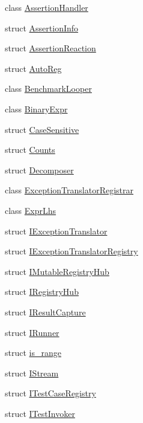 \begin{DoxyCompactItemize}
\item 
class \mbox{\hyperlink{class_catch_1_1_assertion_handler}{Assertion\+Handler}}
\item 
struct \mbox{\hyperlink{struct_catch_1_1_assertion_info}{Assertion\+Info}}
\item 
struct \mbox{\hyperlink{struct_catch_1_1_assertion_reaction}{Assertion\+Reaction}}
\item 
struct \mbox{\hyperlink{struct_catch_1_1_auto_reg}{Auto\+Reg}}
\item 
class \mbox{\hyperlink{class_catch_1_1_benchmark_looper}{Benchmark\+Looper}}
\item 
class \mbox{\hyperlink{class_catch_1_1_binary_expr}{Binary\+Expr}}
\item 
struct \mbox{\hyperlink{struct_catch_1_1_case_sensitive}{Case\+Sensitive}}
\item 
struct \mbox{\hyperlink{struct_catch_1_1_counts}{Counts}}
\item 
struct \mbox{\hyperlink{struct_catch_1_1_decomposer}{Decomposer}}
\item 
class \mbox{\hyperlink{class_catch_1_1_exception_translator_registrar}{Exception\+Translator\+Registrar}}
\item 
class \mbox{\hyperlink{class_catch_1_1_expr_lhs}{Expr\+Lhs}}
\item 
struct \mbox{\hyperlink{struct_catch_1_1_i_exception_translator}{I\+Exception\+Translator}}
\item 
struct \mbox{\hyperlink{struct_catch_1_1_i_exception_translator_registry}{I\+Exception\+Translator\+Registry}}
\item 
struct \mbox{\hyperlink{struct_catch_1_1_i_mutable_registry_hub}{I\+Mutable\+Registry\+Hub}}
\item 
struct \mbox{\hyperlink{struct_catch_1_1_i_registry_hub}{I\+Registry\+Hub}}
\item 
struct \mbox{\hyperlink{struct_catch_1_1_i_result_capture}{I\+Result\+Capture}}
\item 
struct \mbox{\hyperlink{struct_catch_1_1_i_runner}{I\+Runner}}
\item 
struct \mbox{\hyperlink{struct_catch_1_1is__range}{is\+\_\+range}}
\item 
struct \mbox{\hyperlink{struct_catch_1_1_i_stream}{I\+Stream}}
\item 
struct \mbox{\hyperlink{struct_catch_1_1_i_test_case_registry}{I\+Test\+Case\+Registry}}
\item 
struct \mbox{\hyperlink{struct_catch_1_1_i_test_invoker}{I\+Test\+Invoker}}

\end{DoxyCompactItemize}
